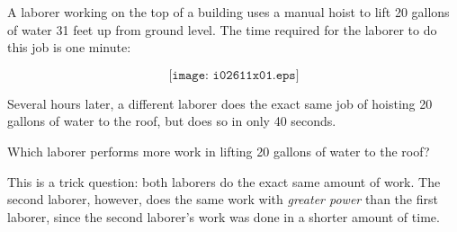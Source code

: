 

A laborer working on the top of a building uses a manual hoist to lift 20 gallons of water 31 feet up from ground level.  The time required for the laborer to do this job is one minute:

$$\texttt{[image: i02611x01.eps]}$$

Several hours later, a different laborer does the exact same job of hoisting 20 gallons of water to the roof, but does so in only 40 seconds.

\vskip 10pt

Which laborer performs more work in lifting 20 gallons of water to the roof?







This is a trick question: both laborers do the exact same amount of work.  The second laborer, however, does the same work with {\it greater power} than the first laborer, since the second laborer's work was done in a shorter amount of time.











